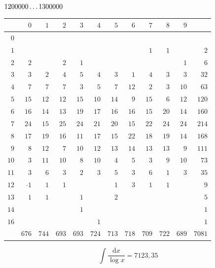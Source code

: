 \clearpage
\noindent\begin{minipage}{\linewidth}\centering
{}
\(1200000\mathinner{.\,.\,.}1300000\)\par\smallskip
\begingroup\fontsize{10.5}{11.5}\selectfont\setlength{\tabcolsep}{3.5pt}\renewcommand{\arraystretch}{1}
\begin{tabular}{r|rrrrrrrrrr|r}\hline
 & $0$ & $1$ & $2$ & $3$ & $4$ & $5$ & $6$ & $7$ & $8$ & $9$ &  \\ \hline
$0$ &  &  &  &  &  &  &  &  &  &  &  \\
$1$ &  &  &  &  &  &  &  & $1$ & $1$ &  & $2$ \\
$2$ & $2$ &  & $2$ & $1$ &  &  &  &  &  & $1$ & $6$ \\
$3$ & $3$ & $2$ & $4$ & $5$ & $4$ & $3$ & $1$ & $4$ & $3$ & $3$ & $32$ \\
$4$ & $7$ & $7$ & $7$ & $3$ & $5$ & $7$ & $12$ & $2$ & $3$ & $10$ & $63$ \\
$5$ & $15$ & $12$ & $12$ & $15$ & $10$ & $14$ & $9$ & $15$ & $6$ & $12$ & $120$ \\
$6$ & $16$ & $14$ & $13$ & $19$ & $17$ & $16$ & $16$ & $15$ & $20$ & $14$ & $160$ \\
$7$ & $24$ & $15$ & $25$ & $24$ & $21$ & $20$ & $15$ & $22$ & $24$ & $24$ & $214$ \\
$8$ & $17$ & $19$ & $16$ & $11$ & $17$ & $15$ & $22$ & $18$ & $19$ & $14$ & $168$ \\
$9$ & $8$ & $12$ & $7$ & $10$ & $12$ & $13$ & $14$ & $13$ & $13$ & $9$ & $111$ \\
$10$ & $3$ & $11$ & $10$ & $8$ & $10$ & $4$ & $5$ & $3$ & $9$ & $10$ & $73$ \\
$11$ & $3$ & $6$ & $3$ & $2$ & $3$ & $5$ & $3$ & $6$ & $1$ & $3$ & $35$ \\
$12$ & $\mathord{\cdot}\!1$ & $1$ & $1$ &  &  & $1$ & $3$ & $1$ & $1$ &  & $9$ \\
$13$ & $1$ & $1$ &  & $1$ &  & $2$ &  &  &  &  & $5$ \\
$14$ &  &  &  & $1$ &  &  &  &  &  &  & $1$ \\
$16$ &  &  &  &  & $1$ &  &  &  &  &  & $1$ \\
\hline
 & $676$ & $744$ & $693$ & $693$ & $724$ & $713$ & $718$ & $709$ & $722$ & $689$ & $7081$ \\ \hline
\end{tabular}\par\endgroup
\setlength{\abovedisplayskip}{6pt}\setlength{\belowdisplayskip}{4pt}
\[\int\frac{\mathrm{d}x}{\log x}=7123{,}35\]
\end{minipage}\par

